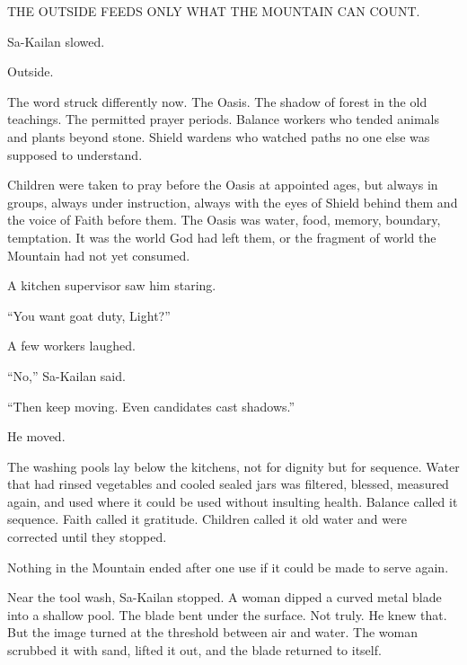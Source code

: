 THE OUTSIDE FEEDS ONLY WHAT THE MOUNTAIN CAN COUNT.\par

Sa-Kailan slowed.\par

Outside.\par

The word struck differently now.
The Oasis.
The shadow of forest in the old teachings.
The permitted prayer periods.
Balance workers who tended animals and plants beyond stone.
Shield wardens who watched paths no one else was supposed to understand.\par

Children were taken to pray before the Oasis at appointed ages, but always in groups, always under instruction, always with the eyes of Shield behind them and the voice of Faith before them.
The Oasis was water, food, memory, boundary, temptation.
It was the world God had left them, or the fragment of world the Mountain had not yet consumed.\par

A kitchen supervisor saw him staring.\par

“You want goat duty, Light?”\par

A few workers laughed.\par

“No,” Sa-Kailan said.\par

“Then keep moving.
Even candidates cast shadows.”\par

He moved.\par

The washing pools lay below the kitchens, not for dignity but for sequence.
Water that had rinsed vegetables and cooled sealed jars was filtered, blessed, measured again, and used where it could be used without insulting health.
Balance called it sequence.
Faith called it gratitude.
Children called it old water and were corrected until they stopped.\par

Nothing in the Mountain ended after one use if it could be made to serve again.\par

Near the tool wash, Sa-Kailan stopped.
A woman dipped a curved metal blade into a shallow pool.
The blade bent under the surface.
Not truly.
He knew that.
But the image turned at the threshold between air and water.
The woman scrubbed it with sand, lifted it out, and the blade returned to itself.\par


